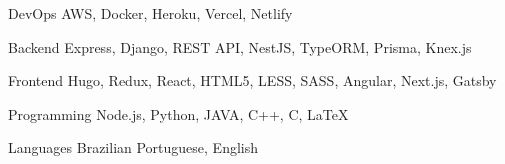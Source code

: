

\begin{cvskills}

  \cvskill
    {DevOps} %
    {AWS, Docker, Heroku, Vercel, Netlify} %

  \cvskill
    {Backend} %
    {Express, Django, REST API, NestJS, TypeORM, Prisma, Knex.js} %

  \cvskill
    {Frontend} %
    {Hugo, Redux, React, HTML5, LESS, SASS, Angular, Next.js, Gatsby} %

  \cvskill
    {Programming} %
    {Node.js, Python, JAVA, C++, C, LaTeX} %

  \cvskill
    {Languages} %
    {Brazilian Portuguese, English} %

\end{cvskills}
